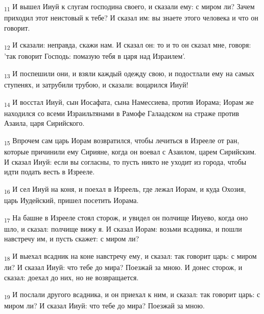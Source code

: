 \begin{tcolorbox}
\textsubscript{11} И вышел Ииуй к слугам господина своего, и сказали ему: с миром ли? Зачем приходил этот неистовый к тебе? И сказал им: вы знаете этого человека и что он говорит.
\end{tcolorbox}
\begin{tcolorbox}
\textsubscript{12} И сказали: неправда, скажи нам. И сказал он: то и то он сказал мне, говоря: 'так говорит Господь: помазую тебя в царя над Израилем'.
\end{tcolorbox}
\begin{tcolorbox}
\textsubscript{13} И поспешили они, и взяли каждый одежду свою, и подостлали ему на самых ступенях, и затрубили трубою, и сказали: воцарился Ииуй!
\end{tcolorbox}
\begin{tcolorbox}
\textsubscript{14} И восстал Ииуй, сын Иосафата, сына Намессиева, против Иорама; Иорам же находился со всеми Израильтянами в Рамофе Галаадском на страже против Азаила, царя Сирийского.
\end{tcolorbox}
\begin{tcolorbox}
\textsubscript{15} Впрочем сам царь Иорам возвратился, чтобы лечиться в Изрееле от ран, которые причинили ему Сирияне, когда он воевал с Азаилом, царем Сирийским. И сказал Ииуй: если вы согласны, то пусть никто не уходит из города, чтобы идти подать весть в Изрееле.
\end{tcolorbox}
\begin{tcolorbox}
\textsubscript{16} И сел Ииуй на коня, и поехал в Изреель, где лежал Иорам, и куда Охозия, царь Иудейский, пришел посетить Иорама.
\end{tcolorbox}
\begin{tcolorbox}
\textsubscript{17} На башне в Изрееле стоял сторож, и увидел он полчище Ииуево, когда оно шло, и сказал: полчище вижу я. И сказал Иорам: возьми всадника, и пошли навстречу им, и пусть скажет: с миром ли?
\end{tcolorbox}
\begin{tcolorbox}
\textsubscript{18} И выехал всадник на коне навстречу ему, и сказал: так говорит царь: с миром ли? И сказал Ииуй: что тебе до мира? Поезжай за мною. И донес сторож, и сказал: доехал до них, но не возвращается.
\end{tcolorbox}
\begin{tcolorbox}
\textsubscript{19} И послали другого всадника, и он приехал к ним, и сказал: так говорит царь: с миром ли? И сказал Ииуй: что тебе до мира? Поезжай за мною.
\end{tcolorbox}
